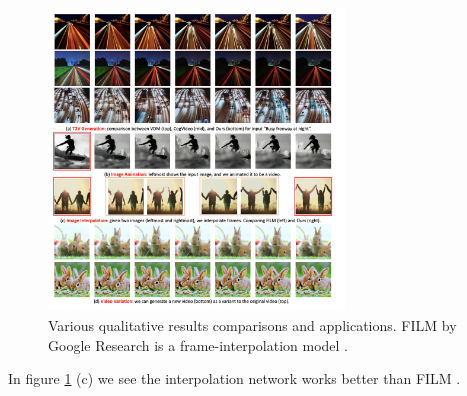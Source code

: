 \begin{figure}
    \centering
    \includegraphics[width=0.7\textwidth]{images/make_a_video/examples2.png}
    \caption{Various qualitative results comparisons and applications. FILM by Google Research is a frame-interpolation model \cite{film}.}
    \label{fig:make_a_video_examples2}
\end{figure}

In figure \ref{fig:make_a_video_examples2} (c) we see the interpolation network works better than FILM \cite{film}.

